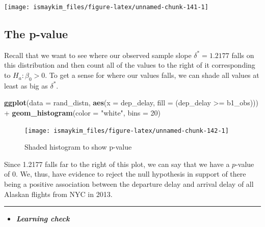 \documentclass[]{tufte-book}
\newenvironment{Shaded}{\begin{snugshade}}{\end{snugshade}}
\newcommand{\KeywordTok}[1]{\textcolor[rgb]{0.13,0.29,0.53}{\textbf{{#1}}}}
\newcommand{\DataTypeTok}[1]{\textcolor[rgb]{0.13,0.29,0.53}{{#1}}}
\newcommand{\DecValTok}[1]{\textcolor[rgb]{0.00,0.00,0.81}{{#1}}}
\newcommand{\StringTok}[1]{\textcolor[rgb]{0.31,0.60,0.02}{{#1}}}
\newcommand{\NormalTok}[1]{{#1}}
\let\oldrule=\rule
\renewcommand{\rule}[1]{\oldrule{\linewidth}}
\newenvironment{rmdblock}[1]
  {\begin{shaded*}
  \begin{itemize}
  \renewcommand{\labelitemi}{
    \raisebox{-.7\height}[0pt][0pt]{
    }
  }
  \item
  }
  {
  \end{itemize}
  \end{shaded*}
  }
\newenvironment{learncheck}
  {\begin{rmdblock}{warning}}
  {\end{rmdblock}}
\begin{document}
\begin{center}\texttt{[image: ismaykim\_files/figure-latex/unnamed-chunk-141-1]} \end{center}

\subsection{The p-value}\label{the-p-value-2}

Recall that we want to see where our observed sample slope
\(\delta^* = 1.2177\) falls on this distribution and then count all of
the values to the right of it corresponding to \(H_a: \beta_0 > 0\). To
get a sense for where our values falls, we can shade all values at least
as big as \(\delta^*\).

\begin{Shaded}
\begin{Highlighting}[]
\KeywordTok{ggplot}\NormalTok{(}\DataTypeTok{data =} \NormalTok{rand_distn, }\KeywordTok{aes}\NormalTok{(}\DataTypeTok{x =} \NormalTok{dep_delay, }\DataTypeTok{fill =} \NormalTok{(dep_delay >=}\StringTok{ }\NormalTok{b1_obs))) +}
\StringTok{  }\KeywordTok{geom_histogram}\NormalTok{(}\DataTypeTok{color =} \StringTok{"white"}\NormalTok{, }\DataTypeTok{bins =} \DecValTok{20}\NormalTok{)}
\end{Highlighting}
\end{Shaded}

\begin{figure}

{\centering \texttt{[image: ismaykim\_files/figure-latex/unnamed-chunk-142-1]} 

}

\caption[Shaded histogram to show p-value]{Shaded histogram to show p-value}\label{fig:unnamed-chunk-142}
\end{figure}

Since 1.2177 falls far to the right of this plot, we can say that we
have a \(p\)-value of 0. We, thus, have evidence to reject the null
hypothesis in support of there being a positive association between the
departure delay and arrival delay of all Alaskan flights from NYC in
2013.

\begin{center}\rule{0.5\linewidth}{\linethickness}\end{center}

\begin{learncheck}
\textbf{\emph{Learning check}}
\end{learncheck}
\end{document}
